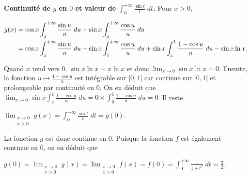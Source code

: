 {{\textbf{Continuité de $g$ en $0$ et valeur de $\int_{0}^{+\infty}\frac{\sin t}{t}\;dt$.} Pour $x>0$,

\begin{align*}\ensuremath
g(x)&=\cos x\int_{x}^{+\infty}\frac{\sin u}{u}\;du-\sin x\int_{x}^{+\infty}\frac{\cos u}{u}\;du\\
 &=\cos x\int_{x}^{+\infty}\frac{\sin u}{u}\;du-\sin x\int_{1}^{+\infty}\frac{\cos u}{u}\;du+\sin x\int_{x}^{1}\frac{1-\cos u}{u}\;du-\sin x\ln x.
\end{align*}

Quand $x$ tend vers $0$, $\sin x\ln x\sim x\ln x$ et donc $\lim_{x \rightarrow 0}\sin x\ln x=0$. Ensuite, la fonction $u\mapsto\frac{1-\cos u}{u}$ est intégrable sur $]0,1]$ car continue sur $]0,1]$ et prolongeable par continuité en $0$. On en déduit que $\lim_{x \rightarrow 0}\sin x\int_{x}^{1}\frac{1-\cos u}{u}\;du=0\times\int_{0}^{1}\frac{1-\cos u}{u}\;du=0$. Il reste

\begin{center}
$\displaystyle\lim_{\substack{x\rightarrow0\\ x>0}}g(x)=\int_{0}^{+\infty}\frac{\sin t}{t}\;dt=g(0)$.
\end{center}

La fonction $g$ est donc continue en $0$. Puisque la fonction $f$ est également continue en $0$, on en déduit que

\begin{center}
$g(0)=\displaystyle\lim_{\substack{x\rightarrow0\\ x>0}}g(x)=\displaystyle\lim_{\substack{x\rightarrow0\\ x>0}}f(x)=f(0)=\int_{0}^{+\infty}\frac{1}{1+t^2}\;dt=\frac{\pi}{2}$.
\end{center}

\begin{center}
\end{center}
}
}
